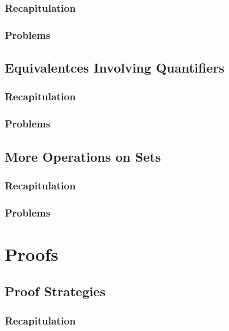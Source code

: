 \documentclass{report}
\begin{document}
        \subsection{Recapitulation}
        
        \subsection{Problems}
        
    \section{Equivalentces Involving Quantifiers}
        \subsection{Recapitulation}
        
        \subsection{Problems}
        
    \section{More Operations on Sets}
        \subsection{Recapitulation}
        
        \subsection{Problems}
        

\chapter{Proofs}
    \section{Proof Strategies}
        \subsection{Recapitulation}
        
\end{document}
